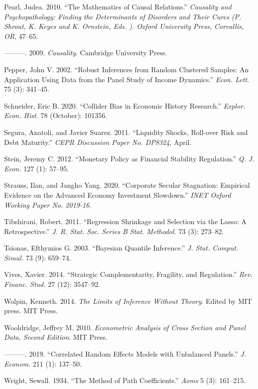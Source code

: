 \documentclass[
  10pt,
]{article}
\begin{document}
\leavevmode\hypertarget{ref-Pearl2010}{}%
Pearl, Judea. 2010. ``The Mathematics of Causal Relations.''
\emph{Causality and Psychopathology: Finding the Determinants of
Disorders and Their Cures (P. Shrout, K. Keyes and K. Ornstein, Eds. ).
Oxford University Press, Corvallis, OR}, 47--65.

\leavevmode\hypertarget{ref-Pearl2009}{}%
---------. 2009. \emph{Causality}. Cambridge University Press.

\leavevmode\hypertarget{ref-Pepper2002}{}%
Pepper, John V. 2002. ``Robust Inferences from Random Clustered Samples:
An Application Using Data from the Panel Study of Income Dynamics.''
\emph{Econ. Lett.} 75 (3): 341--45.

\leavevmode\hypertarget{ref-Schneider2020}{}%
Schneider, Eric B. 2020. ``Collider Bias in Economic History Research.''
\emph{Explor. Econ. Hist.} 78 (October): 101356.

\leavevmode\hypertarget{ref-Segura2011}{}%
Segura, Anatoli, and Javier Suarez. 2011. ``Liquidity Shocks, Roll-over
Risk and Debt Maturity.'' \emph{CEPR Discussion Paper No. DP8324},
April.

\leavevmode\hypertarget{ref-Stein2012}{}%
Stein, Jeremy C. 2012. ``Monetary Policy as Financial Stability
Regulation.'' \emph{Q. J. Econ.} 127 (1): 57--95.

\leavevmode\hypertarget{ref-Strauss2020}{}%
Strauss, Ilan, and Jangho Yang. 2020. ``Corporate Secular Stagnation:
Empirical Evidence on the Advanced Economy Investment Slowdown.''
\emph{INET Oxford Working Paper No. 2019-16}.

\leavevmode\hypertarget{ref-Tibshirani2011}{}%
Tibshirani, Robert. 2011. ``Regression Shrinkage and Selection via the
Lasso: A Retrospective.'' \emph{J. R. Stat. Soc. Series B Stat.
Methodol.} 73 (3): 273--82.

\leavevmode\hypertarget{ref-Tsionas2003}{}%
Tsionas, Efthymios G. 2003. ``Bayesian Quantile Inference.'' \emph{J.
Stat. Comput. Simul.} 73 (9): 659--74.

\leavevmode\hypertarget{ref-Vives2014}{}%
Vives, Xavier. 2014. ``Strategic Complementarity, Fragility, and
Regulation.'' \emph{Rev. Financ. Stud.} 27 (12): 3547--92.

\leavevmode\hypertarget{ref-Wolpin2014}{}%
Wolpin, Kenneth. 2014. \emph{The Limits of Inference Without Theory}.
Edited by MIT press. MIT Press.

\leavevmode\hypertarget{ref-Wooldridge2010}{}%
Wooldridge, Jeffrey M. 2010. \emph{Econometric Analysis of Cross Section
and Panel Data, Second Edition}. MIT Press.

\leavevmode\hypertarget{ref-Wooldridge2019}{}%
---------. 2019. ``Correlated Random Effects Models with Unbalanced
Panels.'' \emph{J. Econom.} 211 (1): 137--50.

\leavevmode\hypertarget{ref-Wright1934}{}%
Wright, Sewall. 1934. ``The Method of Path Coefficients.'' \emph{Aoms} 5
(3): 161--215.
\end{document}
